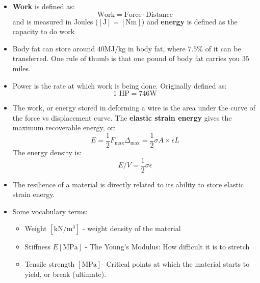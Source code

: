 \begin{itemize}
\begin{center}
    \end{center}
    \item \textbf{Work} is defined as:
    \begin{equation}
        \text{Work} = \text{Force} \cdot \text{Distance}
        \label{eq:}
    \end{equation}
    and is measured in Joules ($[\si{\joule}]=[\si{\newton\meter}]$) and \textbf{energy} is defined as the capacity to do work
    \item Body fat can store around $40\si{\mega\joule\per\kilogram}$ in body fat, where $7.5\%$ of it can be transferred. One rule of thumb is that one pound of body fat carries you $35$ miles.
    \item Power is the rate at which work is being done. Originally defined as:
    \begin{equation}
        1\text{ HP} = 746\si{\watt}
        \label{eq:}
    \end{equation}
    \item The work, or energy stored in deforming a wire is the area under the curve of the force vs displacement curve. The \textbf{elastic strain energy} gives the maximum recoverable energy, or:
    \begin{equation}
        E=\frac{1}{2}F_\text{max}\Delta_\text{max} = \frac{1}{2}\sigma A \times \epsilon L
        \label{eq:}
    \end{equation}
    The energy density is:
    \begin{equation}
        E/V = \frac{1}{2}\sigma\epsilon
        \label{eq:}
    \end{equation}
    \item The resilience of a material is directly related to its ability to store elastic strain energy.
    \item Some vocabulary terms:
    \begin{itemize}
        \item Weight $[\si{\kilo\newton\per\meter\cubed}]$ - weight density of the material
        \item Stiffness $E[\si{\mega\pascal}]$ - The Young's Modulus: How difficult it is to stretch
        \item Tensile strength $[\si{\mega\pascal}]$- Critical points at which the material starts to yield, or break (ultimate).

\end{itemize}
\end{itemize}
